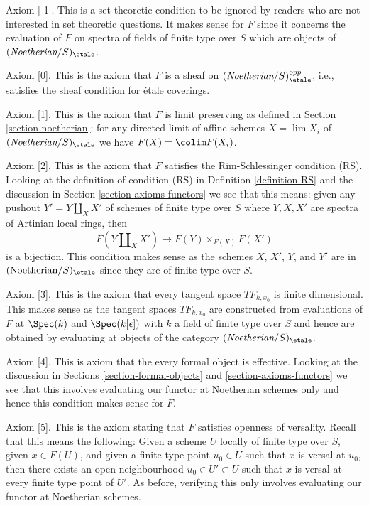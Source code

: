 \medskip\noindent
Axiom [-1]. This is a set theoretic condition to be ignored
by readers who are not interested in set theoretic questions.
It makes sense for $F$ since it concerns the evaluation of
$F$ on spectra of fields of finite type over $S$ which are
objects of $(\textit{Noetherian}/S)_\etale$.

\medskip\noindent
Axiom [0]. This is the axiom that $F$ is a sheaf
on $(\textit{Noetherian}/S)_\etale^{opp}$, i.e., satisfies
the sheaf condition for \'etale coverings.

\medskip\noindent
Axiom [1]. This is the axiom that $F$ is limit preserving as defined
in Section \ref{section-noetherian}:  for any
directed limit of affine schemes $X = \lim X_i$ of
$(\textit{Noetherian}/S)_\etale$ we have $F(X) = \colim F(X_i)$.

\medskip\noindent
Axiom [2]. This is the axiom that  $F$ satisfies the Rim-Schlessinger
condition (RS). Looking at the definition of condition (RS) in
Definition \ref{definition-RS} and the discussion in
Section \ref{section-axioms-functors}
we see that this means: given any pushout $Y' = Y \amalg_X X'$
of schemes of finite type over $S$ where $Y, X, X'$
are spectra of Artinian local rings, then
$$
F(Y \amalg_X X') \to F(Y) \times_{F(X)} F(X')
$$
is a bijection. This condition makes sense as the schemes
$X$, $X'$, $Y$, and $Y'$ are in $(\text{Noetherian}/S)_\etale$
since they are of finite type over $S$.

\medskip\noindent
Axiom [3]. This is the axiom that every tangent space $TF_{k, x_0}$
is finite dimensional. This makes sense as the tangent spaces $TF_{k, x_0}$
are constructed from evaluations of $F$ at $\Spec(k)$ and
$\Spec(k[\epsilon])$ with $k$ a field of finite type over $S$
and hence are obtained by evaluating at objects of the category
$(\textit{Noetherian}/S)_\etale$.

\medskip\noindent
Axiom [4]. This is axiom that the every formal object is effective.
Looking at the discussion in
Sections \ref{section-formal-objects} and \ref{section-axioms-functors}
we see that this involves evaluating our functor at Noetherian schemes
only and hence this condition makes sense for $F$.

\medskip\noindent
Axiom [5]. This is the axiom stating that $F$ satisfies openness of versality.
Recall that this means the following: Given a scheme $U$
locally of finite type over $S$, given $x \in F(U)$, and given
a finite type point $u_0 \in U$ such that $x$ is versal at $u_0$,
then there exists an open neighbourhood $u_0 \in U' \subset U$
such that $x$ is versal at every finite type point of $U'$.
As before, verifying this only involves evaluating
our functor at Noetherian schemes.


